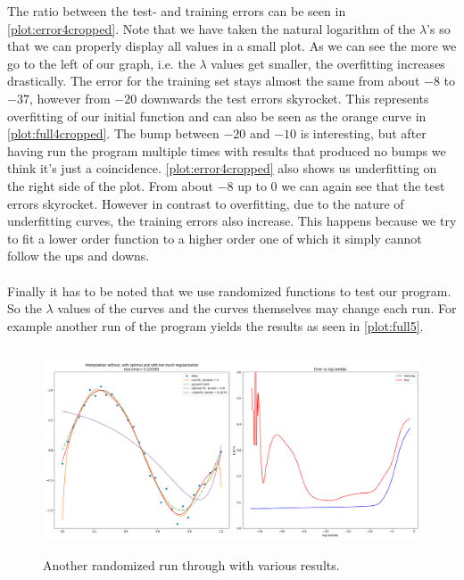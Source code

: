 \documentclass{article}
\begin{document}
The ratio between the test- and training errors can be seen in \autoref{plot:error4cropped}. Note that we have taken the natural logarithm of the $\lambda$'s so that we can properly display all values in a small plot. As we can see the more we go to the left of our graph, i.e. the $\lambda$ values get smaller, the overfitting increases drastically. The error for the training set stays almost the same from about $-8$ to $-37$, however from $-20$ downwards the test errors skyrocket. This represents overfitting of our initial function and can also be seen as the orange curve in \autoref{plot:full4cropped}. The bump between $-20$ and $-10$ is interesting, but after having run the program multiple times with results that produced no bumps we think it's just a coincidence. \autoref{plot:error4cropped} also shows us underfitting on the right side of the plot. From about $-8$ up to $0$ we can again see that the test errors skyrocket. However in contrast to overfitting, due to the nature of underfitting curves, the training errors also increase. This happens because we try to fit a lower order function to a higher order one of which it simply cannot follow the ups and downs. \\
\\
Finally it has to be noted that we use randomized functions to test our program. So the $\lambda$ values of the curves and the curves themselves may change each run. For example another run of the program yields the results as seen in \autoref{plot:full5}.

\begin{figure}[h]
	\centering
	\includegraphics[width=\linewidth,height=6.1cm]{plots/full5.png}
	\caption{Another randomized run through with various results.}
	\label{plot:full5}
\end{figure}
	
\end{document}
